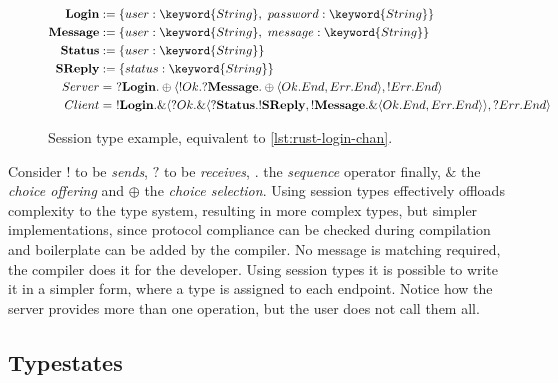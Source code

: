 \begin{figure}
    \begin{align*}
        \mathbf{Login}   & := \{user: \keyword{String},~password: \keyword{String}\}                                                                                                 \\
        \mathbf{Message} & := \{user: \keyword{String},~message: \keyword{String}\}                                                                                                  \\
        \mathbf{Status}  & := \{user: \keyword{String}\}                                                                                                                             \\
        \mathbf{SReply}  & := \{status: \keyword{String}\}                                                                                                                           \\
        Server           & = ~?\mathbf{Login}.\oplus\langle !Ok.?\mathbf{Message}.\oplus\langle Ok.End, Err.End \rangle, !Err.End\rangle                                             \\
        Client           & = ~!\mathbf{Login}.\&\langle ?Ok.\&\langle ?\mathbf{Status}.!\mathbf{SReply}, !\mathbf{Message}.\&\langle Ok.End, Err.End \rangle\rangle, ?Err.End\rangle
    \end{align*}
    \caption{Session type example, equivalent to \autoref{lst:rust-login-chan}.}
    \label{eq:session-types}
\end{figure}

Consider $!$ to be \emph{sends}, $?$ to be \emph{receives}, $.$ the \emph{sequence} operator finally,
$\&$ the \emph{choice offering} and $\oplus$ the \emph{choice selection}.
Using session types effectively offloads complexity to the type system,
resulting in more complex types, but simpler implementations,
since protocol compliance can be checked during compilation and boilerplate can be added by the compiler.
No message is matching required, the compiler does it for the developer.
Using session types it is possible to write it in a simpler form, where a type is assigned to each endpoint.
Notice how the server provides more than one operation, but the user does not call them all.

\subsection{Typestates}\label{sec:typestates}

